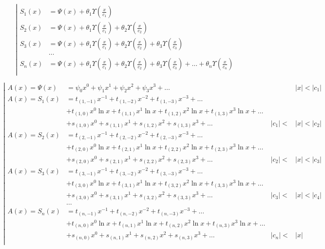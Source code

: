 \begin{equation*} \left| \begin{aligned}
S_1(x) &=
  \Psi(x)
+ \theta_1 \Upsilon{\left(\frac{x}{c_1} \right)} \\
%
S_2(x) &=
  \Psi(x)
+ \theta_1 \Upsilon{\left(\frac{x}{c_1} \right)}
+ \theta_2 \Upsilon{\left(\frac{x}{c_2} \right)} \\
%
S_3(x) &=
  \Psi(x)
+ \theta_1 \Upsilon{\left(\frac{x}{c_1} \right)}
+ \theta_2 \Upsilon{\left(\frac{x}{c_2} \right)}
+ \theta_3 \Upsilon{\left(\frac{x}{c_3} \right)} \\
%
&\ldots \\
%
S_n(x) &=
  \Psi(x)
+ \theta_1 \Upsilon{\left(\frac{x}{c_1} \right)}
+ \theta_2 \Upsilon{\left(\frac{x}{c_2} \right)}
+ \theta_3 \Upsilon{\left(\frac{x}{c_3} \right)}
+ \ldots
+ \theta_n \Upsilon{\left(\frac{x}{c_n} \right)} \\
\end{aligned} \right. \end{equation*}

\begin{equation*} \left| \begin{aligned}
A(x) = \Psi(x) &=
  \psi_0 x^0
+ \psi_1 x^1
+ \psi_2 x^2
+ \psi_3 x^3
+ \ldots &
&|x| < |c_1| \\
%
A(x) = S_1(x) &= 
  t_{(1,-1)} x^{-1}
+ t_{(1,-2)} x^{-2}
+ t_{(1,-3)} x^{-3}
+ \ldots \\ &
+ t_{(1,0)} x^0 \ln{x}
+ t_{(1,1)} x^1 \ln{x}
+ t_{(1,2)} x^2 \ln{x}
+ t_{(1,3)} x^3 \ln{x}
+ \ldots \\ &
+ s_{(1,0)} x^0
+ s_{(1,1)} x^1
+ s_{(1,2)} x^2
+ s_{(1,3)} x^3
+ \ldots &
|c_1| < &|x| < |c_2| \\
%
A(x) = S_2(x) &= 
  t_{(2,-1)} x^{-1}
+ t_{(2,-2)} x^{-2}
+ t_{(2,-3)} x^{-3}
+ \ldots \\ &
+ t_{(2,0)} x^0 \ln{x}
+ t_{(2,1)} x^1 \ln{x}
+ t_{(2,2)} x^2 \ln{x}
+ t_{(2,3)} x^3 \ln{x}
+ \ldots \\ &
+ s_{(2,0)} x^0
+ s_{(2,1)} x^1
+ s_{(2,2)} x^2
+ s_{(2,3)} x^3
+ \ldots &
|c_2| < &|x| < |c_3| \\
%
A(x) = S_3(x) &= 
  t_{(3,-1)} x^{-1}
+ t_{(3,-2)} x^{-2}
+ t_{(3,-3)} x^{-3}
+ \ldots \\ &
+ t_{(3,0)} x^0 \ln{x}
+ t_{(3,1)} x^1 \ln{x}
+ t_{(3,2)} x^2 \ln{x}
+ t_{(3,3)} x^3 \ln{x}
+ \ldots \\ &
+ s_{(3,0)} x^0
+ s_{(3,1)} x^1
+ s_{(3,2)} x^2
+ s_{(3,3)} x^3
+ \ldots &
|c_3| < &|x| < |c_4| \\
%
&\ldots \\
%
A(x) = S_n(x) &= 
  t_{(n,-1)} x^{-1}
+ t_{(n,-2)} x^{-2}
+ t_{(n,-3)} x^{-3}
+ \ldots \\ &
+ t_{(n,0)} x^0 \ln{x}
+ t_{(n,1)} x^1 \ln{x}
+ t_{(n,2)} x^2 \ln{x}
+ t_{(n,3)} x^3 \ln{x}
+ \ldots \\ &
+ s_{(n,0)} x^0
+ s_{(n,1)} x^1
+ s_{(n,2)} x^2
+ s_{(n,3)} x^3
+ \ldots &
|c_n| < &|x| \\
\end{aligned} \right. \end{equation*}


